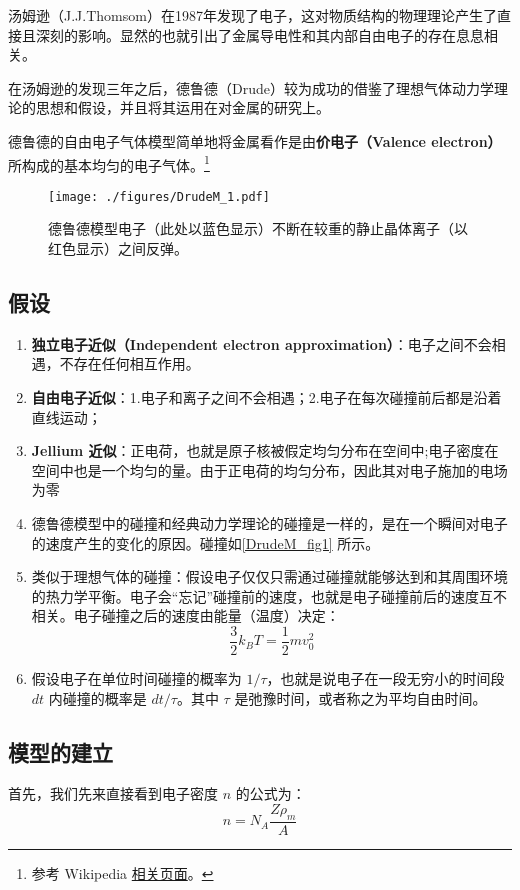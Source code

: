 
汤姆逊（J.J.Thomsom）在1987年发现了电子，这对物质结构的物理理论产生了直接且深刻的影响。显然的也就引出了金属导电性和其内部自由电子的存在息息相关。

在汤姆逊的发现三年之后，德鲁德（Drude）较为成功的借鉴了理想气体动力学理论的思想和假设，并且将其运用在对金属的研究上。

德鲁德的自由电子气体模型简单地将金属看作是由\textbf{价电子（Valence electron）}所构成的基本均匀的电子气体。\footnote{参考 Wikipedia \href{https://en.wikipedia.org/wiki/Drude_model}{相关页面}。}
\begin{figure}[ht]
\centering
\texttt{[image: ./figures/DrudeM\_1.pdf]}
\caption{德鲁德模型电子（此处以蓝色显示）不断在较重的静止晶体离子（以红色显示）之间反弹。} \label{DrudeM_fig1}
\end{figure}
\subsection{假设}
\begin{enumerate}
\item \textbf{独立电子近似（Independent electron approximation）}：电子之间不会相遇，不存在任何相互作用。
\item \textbf{自由电子近似}：1.电子和离子之间不会相遇；2.电子在每次碰撞前后都是沿着直线运动；
\item \textbf{Jellium 近似}：正电荷，也就是原子核被假定均匀分布在空间中;电子密度在空间中也是一个均匀的量。由于正电荷的均匀分布，因此其对电子施加的电场为零
\item 德鲁德模型中的碰撞和经典动力学理论的碰撞是一样的，是在一个瞬间对电子的速度产生的变化的原因。碰撞如\autoref{DrudeM_fig1} 所示。
\item 类似于理想气体的碰撞：假设电子仅仅只需通过碰撞就能够达到和其周围环境的热力学平衡。电子会“忘记”碰撞前的速度，也就是电子碰撞前后的速度互不相关。电子碰撞之后的速度由能量（温度）决定：
\begin{equation}\label{DrudeM_eq7}
\frac{3}{2}k_BT = \frac{1}{2}mv_0^2
\end{equation}
\item 假设电子在单位时间碰撞的概率为 $1/\tau $，也就是说电子在一段无穷小的时间段 $dt$ 内碰撞的概率是 $dt/\tau$。其中 $\tau$ 是弛豫时间，或者称之为平均自由时间。
\end{enumerate}
\subsection{模型的建立}
首先，我们先来直接看到电子密度 $n$ 的公式为：
\begin{equation}
n=N_A\frac{Z\rho_m}{A}
\end{equation}

